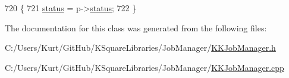 \begin{DoxyCode}
720 \{
721   \hyperlink{class_k_k_job_managment_1_1_k_k_job_a7d47b57d658db4208037511f7f663be9}{status} = p->\hyperlink{class_k_k_job_managment_1_1_k_k_job_a7d47b57d658db4208037511f7f663be9}{status};
722 \}
\end{DoxyCode}


The documentation for this class was generated from the following files\+:\begin{DoxyCompactItemize}
\item 
C\+:/\+Users/\+Kurt/\+Git\+Hub/\+K\+Square\+Libraries/\+Job\+Manager/\hyperlink{_k_k_job_manager_8h}{K\+K\+Job\+Manager.\+h}\item 
C\+:/\+Users/\+Kurt/\+Git\+Hub/\+K\+Square\+Libraries/\+Job\+Manager/\hyperlink{_k_k_job_manager_8cpp}{K\+K\+Job\+Manager.\+cpp}\end{DoxyCompactItemize}
